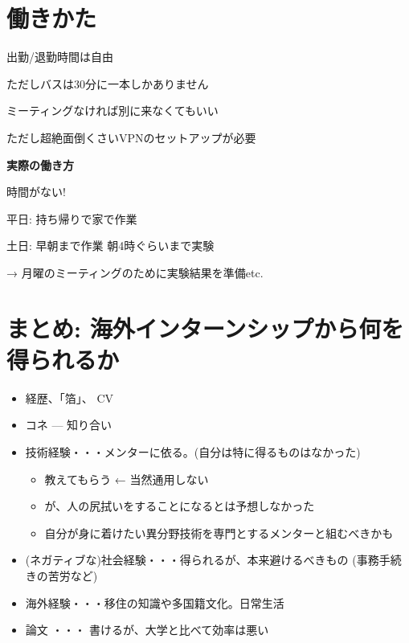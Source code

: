 \section{働きかた}
\label{sec-15}


\begin{container-fluid}
\begin{row-fluid}
\begin{span6}
出勤/退勤時間は自由

ただしバスは30分に一本しかありません

ミーティングなければ別に来なくてもいい

ただし超絶面倒くさいVPNのセットアップが必要
\end{span6}
\begin{span6}
\textbf{実際の働き方}

時間がない!

平日: 持ち帰りで家で作業

土日: 早朝まで作業 朝4時ぐらいまで実験

→ 月曜のミーティングのために実験結果を準備etc.
\end{span6}
\end{row-fluid}
\end{container-fluid}

\section{まとめ: 海外インターンシップから何を得られるか}
\label{sec-16}

\begin{itemize}
\item 経歴、「箔」、 CV
\item コネ --- 知り合い
\item 技術経験・・・メンターに依る。(自分は特に得るものはなかった)
\begin{itemize}
\item 教えてもらう ← 当然通用しない
\item が、人の尻拭いをすることになるとは予想しなかった
\item 自分が身に着けたい異分野技術を専門とするメンターと組むべきかも
\end{itemize}
\item (ネガティブな)社会経験・・・得られるが、本来避けるべきもの (事務手続きの苦労など)
\item 海外経験・・・移住の知識や多国籍文化。日常生活
\item 論文 ・・・ 書けるが、大学と比べて効率は悪い
\end{itemize}
